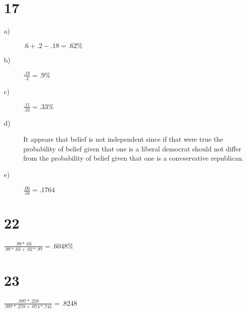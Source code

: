 \documentclass[12pt]{article}
\begin{document}
\section*{17}
\begin{description}
\item[a)] $.6 + .2 - .18 = .62\%$
\item[b)] $\frac{.18}{.2} = .9\%$
\item[c)] $\frac{.11}{.33} = .33\%$
\item[d)] It appears that belief is not independent since if that were true 
    the probability of belief given that one is a liberal democrat should 
    not differ from the probability of belief given that one is a 
    convservative republican. 
\item[e)] $\frac{.06}{.34} = .1764$
\end{description}

\section*{22} 
$\frac{.99*.03}{.99*.03 + .02*.97} = .6048\%$
\section*{23}
$\frac{.997*.259}{.997*.259 + .074*.741} = .8248$
\end{document}
